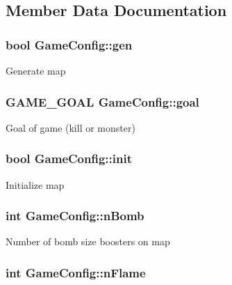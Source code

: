 \subsection{Member Data Documentation}
\hypertarget{class_game_config_aa90aa318b3fd01230547b1728920d53f}{
\subsubsection[{gen}]{\setlength{\rightskip}{0pt plus 5cm}bool Game\-Config\-::gen}}\label{class_game_config_aa90aa318b3fd01230547b1728920d53f}
Generate map \hypertarget{class_game_config_a1d62215e22afec4de042262a8ac34265}{
\subsubsection[{goal}]{\setlength{\rightskip}{0pt plus 5cm}G\-A\-M\-E\-\_\-\-G\-O\-A\-L Game\-Config\-::goal}}\label{class_game_config_a1d62215e22afec4de042262a8ac34265}
Goal of game (kill or monster) \hypertarget{class_game_config_a0389cbafde3a55d7f6fb5ff288f911f3}{
\subsubsection[{init}]{\setlength{\rightskip}{0pt plus 5cm}bool Game\-Config\-::init}}\label{class_game_config_a0389cbafde3a55d7f6fb5ff288f911f3}
Initialize map \hypertarget{class_game_config_a6b48f50aed695811e24b0d808ba12940}{
\subsubsection[{n\-Bomb}]{\setlength{\rightskip}{0pt plus 5cm}int Game\-Config\-::n\-Bomb}}\label{class_game_config_a6b48f50aed695811e24b0d808ba12940}
Number of bomb size boosters on map \hypertarget{class_game_config_a4e1eb0b2c04ceb1523ce940dfdd3e718}{
\subsubsection[{n\-Flame}]{\setlength{\rightskip}{0pt plus 5cm}int Game\-Config\-::n\-Flame}}\label{class_game_config_a4e1eb0b2c04ceb1523ce940dfdd3e718}
